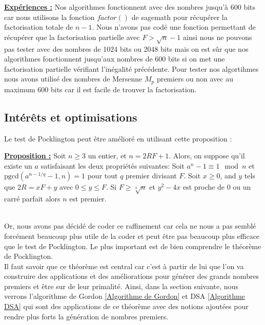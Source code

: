 \underline{\textbf{Expériences :}}
Nos algorithmes fonctionnent avec des nombres jusqu'à 600 bits car nous utilisons la fonction $factor()$ de sagemath pour récupérer la factorisation totale de $n-1$. Nous n'avons pas codé une fonction permettant de récupérer que la factorisation partielle avec $F > \sqrt{n}-1 $ ainsi nous ne pouvons pas tester avec des nombres de 1024 bits ou 2048 bits mais on est sûr que nos algorithmes fonctionnent jusqu'aux nombres de 600 bits si on met une factorisation partielle vérifiant l'inégalité précédente. Pour tester nos algortihmes nous avons utilisé des nombres de Mersenne $M_p$ premiers ou non avec au maximum 600 bits car il est facile de trouver la factorisation.

\subsection{Intérêts et optimisations}

Le test de Pocklington peut être amélioré en utilisant cette proposition :

\underline{\textbf{Proposition :}}
Soit $n \geq 3$ un entier, et $n=2RF+1$. Alors, on suppose qu'il existe un $a$ satisfaisant les deux propriétés suivantes: Soit $a^n-1 \equiv 1 \mod n$ et $ \text{pgcd}(a^{n-1/q} -1,n)=1$ pour tout $q$ premier divisant $F$. Soit $x\geq 0$, and $y$ tels que $2R=xF+y $ avec $0\leq y \leq F$. Si $F \geq \sqrt[3\,]{n}$ et $y^2-4x$ est proche de 0 ou un carré parfait alors $n$ est premier.

\\ 
Or, nous avons pas décidé de coder ce raffinement car cela ne nous a pas semblé forcément beaucoup plus utile de la coder et peut être pas beaucoup plus efficace que le test de Pocklington. Le plus important est de bien comprendre le théorème de Pocklington.
\\
Il faut savoir que ce théorème est central car c'est à partir de lui que l'on va construire des applications et des améliorations pour générer des grands nombres premiers et être sur de leur primalité. Ainsi, dans la section suivante, nous verrons l'algorithme de Gordon \ref{Algorithme de Gordon} et DSA \ref{Algorithme DSA} qui sont des applications de ce théorème avec des notions ajoutées pour rendre plus forts la génération de nombres premiers.

